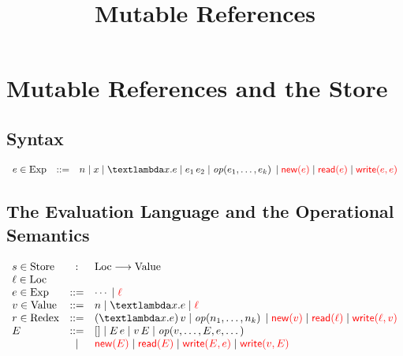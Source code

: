 \documentclass{article}
\title{Mutable References}
\author{}
\date{}
\begin{document}
\maketitle

\section{Mutable References and the Store}
\subsection{Syntax}

\[\begin{array}{lcl}
\NT{e}{Exp} \NTEq
    n \NTSep
    x \NTSep
    \TFun{x}{e} \NTSep
    \TApp{e_1}{e_2} \NTSep
    \TOp{e_1,\dots,e_k} \NTSep
    \textcolor{red}{\TNew{e}} \NTSep
    \textcolor{red}{\TRead{e}} \NTSep
    \textcolor{red}{\TWrite{e}{e}}
    \\
\end{array}\]

\subsection{The Evaluation Language and the Operational Semantics}

\[\begin{array}{lcl}
\NT{s}{Store} &:&
    \text{Loc} \longrightarrow \text{Value}
    \\
\NT{\TLoc}{Loc} &&
    \\
\NT{e}{Exp} \NTEq
    \cdots \NTSep
    \textcolor{red}{\TLoc}
    \\
\NT{v}{Value} \NTEq
    n \NTSep
    \TFun{x}{e} \NTSep
    \textcolor{red}{\TLoc}
    \\
\NT{r}{Redex} \NTEq
    \TApp{(\TFun{x}{e})}{v} \NTSep
    \TOp{n_1,\dots,n_k} \NTSep
    \textcolor{red}{\TNew{v}} \NTSep
    \textcolor{red}{\TRead{\TLoc}} \NTSep
    \textcolor{red}{\TWrite{\TLoc}{v}}
    \\
E \NTEq
    \THole \NTSep
    \TApp{E}{e} \NTSep
    \TApp{v}{E} \NTSep
    \TOp{v,\dots,E,e,\dots} \NTSepln
    \textcolor{red}{\TNew{E}} \NTSep
    \textcolor{red}{\TRead{E}} \NTSep
    \textcolor{red}{\TWrite{E}{e}} \NTSep
    \textcolor{red}{\TWrite{v}{E}}
\end{array}\]
\end{document}

